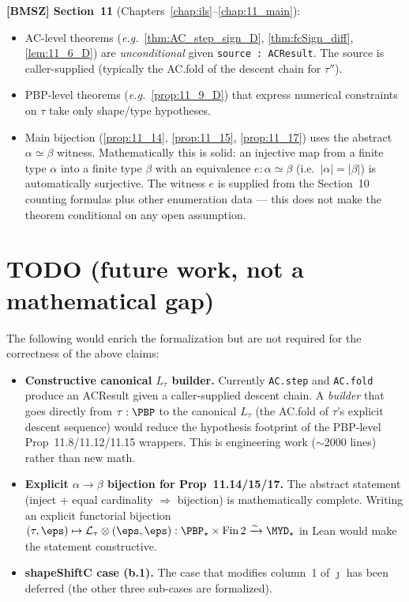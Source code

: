 \textbf{[BMSZ] Section~11} (Chapters~\ref{chap:ils}--\ref{chap:11_main}):
\begin{itemize}
\item AC-level theorems (\emph{e.g.}~\ref{thm:AC_step_sign_D}, \ref{thm:fcSign_diff}, \ref{lem:11_6_D}) are
  \emph{unconditional} given \texttt{source : ACResult}. The source is
  caller-supplied (typically the AC.fold of the descent chain for $\tau''$).
\item PBP-level theorems (\emph{e.g.}~\ref{prop:11_9_D}) that express
  numerical constraints on $\tau$ take only shape/type hypotheses.
\item Main bijection (\ref{prop:11_14}, \ref{prop:11_15}, \ref{prop:11_17}) uses the
  abstract $\alpha \simeq \beta$ witness. Mathematically this is solid:
  an injective map from a finite type $\alpha$ into a finite type $\beta$ with
  an equivalence $e : \alpha \simeq \beta$ (i.e.\ $|\alpha| = |\beta|$) is
  automatically surjective. The witness $e$ is supplied from the Section~10
  counting formulas plus other enumeration data — this does not make the
  theorem conditional on any open assumption.
\end{itemize}

\section{TODO (future work, not a mathematical gap)}
\label{sec:status_todo}

The following would enrich the formalization but are not required for the
correctness of the above claims:

\begin{itemize}
  \item \textbf{Constructive canonical \(L_\tau\) builder.} Currently
    \texttt{AC.step} and \texttt{AC.fold} produce an ACResult given a caller-supplied
    descent chain. A \emph{builder} that goes directly from \(\tau : \PBP\) to the
    canonical \(L_\tau\) (the AC.fold of \(\tau\)'s explicit descent sequence)
    would reduce the hypothesis footprint of the PBP-level Prop~11.8/11.12/11.15
    wrappers. This is engineering work ($\sim$2000 lines) rather than new math.
  \item \textbf{Explicit \(\alpha \to \beta\) bijection for Prop~11.14/15/17.}
    The abstract statement (inject + equal cardinality $\Rightarrow$ bijection)
    is mathematically complete. Writing an explicit functorial bijection
    $(\tau, \eps) \mapsto \mathcal{L}_\tau \otimes (\eps, \eps) : \PBP_\star \times \mathrm{Fin}\,2 \xrightarrow{\sim} \MYD_\star$
    in Lean would make the statement constructive.
  \item \textbf{shapeShiftC case (b.1).} The case that modifies column~1 of
    $\jmath$ has been deferred (the other three sub-cases are formalized).
\end{itemize}

